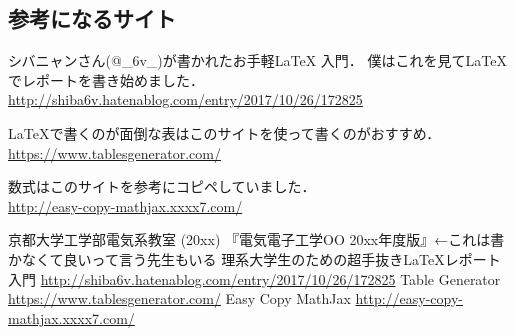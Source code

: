 \documentclass[autodetect-engine,dvipdfmx-if-dvi,ja=standard,a4paper,11pt,titlepage]{bxjsarticle}
\begin{document}
\subsection{参考になるサイト}
\label{sub:d_site}
シバニャンさん(@\_6v\_)が書かれたお手軽\LaTeX{} 入門\cite{_6v_}．
僕はこれを見て\LaTeX{} でレポートを書き始めました．\\
\url{http://shiba6v.hatenablog.com/entry/2017/10/26/172825}

\LaTeX{}で書くのが面倒な表はこのサイト\cite{tablegen}を使って書くのがおすすめ．\\
\url{https://www.tablesgenerator.com/}

数式はこのサイト\cite{mathjax}を参考にコピペしていました．\\
\url{http://easy-copy-mathjax.xxxx7.com/}


\begin{thebibliography}{9}
 京都大学工学部電気系教室 (20xx) 『電気電子工学OO 20xx年度版』←これは書かなくて良いって言う先生もいる
 理系大学生のための超手抜きLaTeXレポート入門 \url{http://shiba6v.hatenablog.com/entry/2017/10/26/172825}
 Table Generator \url{https://www.tablesgenerator.com/}
 Easy Copy MathJax \url{http://easy-copy-mathjax.xxxx7.com/}
\end{thebibliography}
\end{document}
